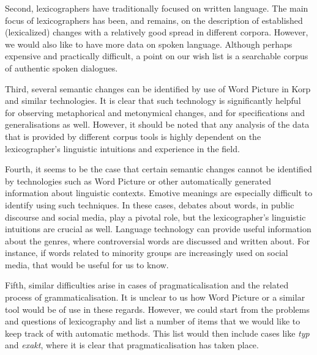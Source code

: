 \documentclass[output=paper]{langscibook}
\begin{document}
Second, lexicographers have traditionally focused on written language. The main focus of lexicographers has been, and remains, on the description of established (lexicalized) changes with a relatively good spread in different corpora. However, we would also like to have more data on spoken language. Although perhaps expensive and practically difficult, a point on our wish list is a searchable corpus of authentic spoken dialogues.   

Third, several semantic changes can be identified by use of Word Picture in Korp and similar technologies. It is clear that such technology is significantly helpful for observing metaphorical and metonymical changes, and for specifications and generalisations as well. However, it should be noted that any analysis of the data that is provided by  different corpus tools is highly dependent on the lexicographer's linguistic intuitions and experience in the field.  

Fourth, it seems to be the case that certain semantic changes cannot be identified by technologies such as Word Picture or other automatically generated information about linguistic contexts. Emotive meanings are especially difficult to identify using such techniques. In these cases, debates about words, in public discourse and social media, play a pivotal role, but the lexicographer's linguistic intuitions are crucial as well. Language technology can provide useful information about the genres, where controversial words are discussed and written about. For instance, if words related to minority groups are increasingly used on social media, that would be useful for us to know. 

Fifth, similar difficulties arise in cases of pragmaticalisation and the related process of grammaticalisation. It is unclear to us how Word Picture or a similar tool would be of use in these regards. However, we could start from the problems and questions of lexicography and list a number of items that we would like to keep track of with automatic methods. This list would then include cases like \emph{typ} and \emph{exakt}, where it is clear that pragmaticalisation has taken place. 
\end{document}
